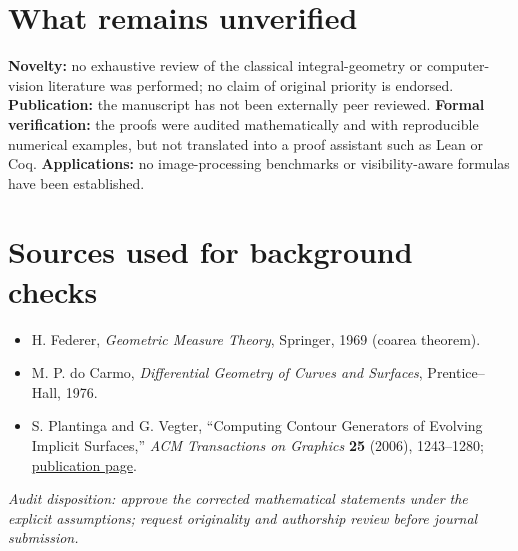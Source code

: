 \documentclass[11pt,a4paper]{article}
\begin{document}
\section*{What remains unverified}
\textbf{Novelty:} no exhaustive review of the classical integral-geometry or computer-vision literature was performed; no claim of original priority is endorsed. \textbf{Publication:} the manuscript has not been externally peer reviewed. \textbf{Formal verification:} the proofs were audited mathematically and with reproducible numerical examples, but not translated into a proof assistant such as Lean or Coq. \textbf{Applications:} no image-processing benchmarks or visibility-aware formulas have been established.

\section*{Sources used for background checks}
\begin{itemize}[leftmargin=*,itemsep=0pt]
\item H. Federer, \emph{Geometric Measure Theory}, Springer, 1969 (coarea theorem).
\item M. P. do Carmo, \emph{Differential Geometry of Curves and Surfaces}, Prentice--Hall, 1976.
\item S. Plantinga and G. Vegter, ``Computing Contour Generators of Evolving Implicit Surfaces,'' \emph{ACM Transactions on Graphics} \textbf{25} (2006), 1243--1280; \href{https://research.rug.nl/en/publications/computing-contour-generators-of-evolving-implicit-surfaces/}{publication page}.
\end{itemize}
\vfill\small\emph{Audit disposition: approve the corrected mathematical statements under the explicit assumptions; request originality and authorship review before journal submission.}
\end{document}
